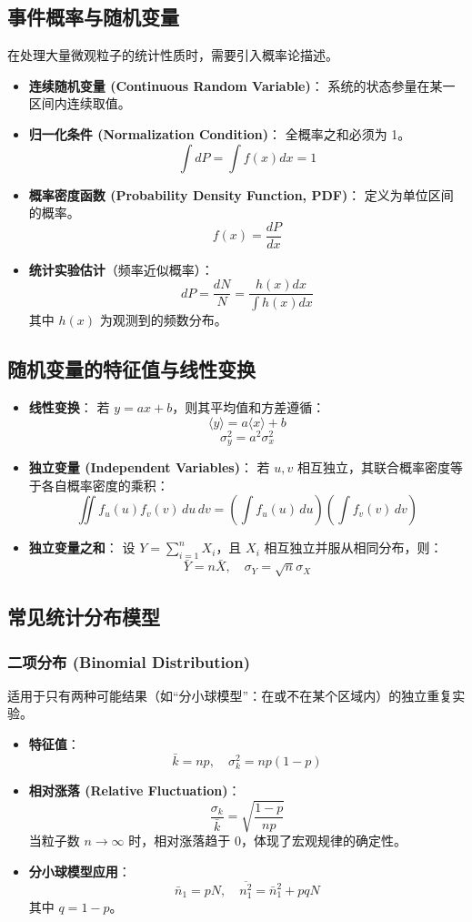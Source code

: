 \documentclass{article}
\begin{document}
\subsection{事件概率与随机变量}
在处理大量微观粒子的统计性质时，需要引入概率论描述。
\begin{itemize}
    \item \textbf{连续随机变量 (Continuous Random Variable)}：
    系统的状态参量在某一区间内连续取值。
    \item \textbf{归一化条件 (Normalization Condition)}：
    全概率之和必须为 1。
    \[ \int dP = \int f(x) dx = 1 \]
    \item \textbf{概率密度函数 (Probability Density Function, PDF)}：
    定义为单位区间的概率。
    \[ f(x) = \frac{dP}{dx} \]
    \item \textbf{统计实验估计}（频率近似概率）：
    \[ dP = \frac{dN}{N} = \frac{h(x) dx}{\int h(x) dx} \]
    其中 $h(x)$ 为观测到的频数分布。
\end{itemize}

\subsection{随机变量的特征值与线性变换}
\begin{itemize}
    \item \textbf{线性变换}：
    若 $y = ax + b$，则其平均值和方差遵循：
    \[ \langle y \rangle = a \langle x \rangle + b \]
    \[ \sigma_y^2 = a^2 \sigma_x^2 \]
    \item \textbf{独立变量 (Independent Variables)}：
    若 $u, v$ 相互独立，其联合概率密度等于各自概率密度的乘积：
    \[ \iint f_u(u) f_v(v) \, du \, dv = \left( \int f_u(u) \, du \right) \left( \int f_v(v) \, dv \right) \]
    \item \textbf{独立变量之和}：
    设 $Y = \sum_{i=1}^n X_i$，且 $X_i$ 相互独立并服从相同分布，则：
    \[ \bar{Y} = n \bar{X}, \quad \sigma_Y = \sqrt{n} \sigma_X \]
\end{itemize}

\subsection{常见统计分布模型}

\subsubsection{二项分布 (Binomial Distribution)}
适用于只有两种可能结果（如“分小球模型”：在或不在某个区域内）的独立重复实验。
\begin{itemize}
    \item \textbf{特征值}：
    \[ \bar{k} = np, \quad \sigma_k^2 = np(1-p) \]
    \item \textbf{相对涨落 (Relative Fluctuation)}：
    \[ \frac{\sigma_k}{\bar{k}} = \sqrt{\frac{1-p}{np}} \]
    当粒子数 $n \to \infty$ 时，相对涨落趋于 0，体现了宏观规律的确定性。
    \item \textbf{分小球模型应用}：
    \[ \bar{n}_1 = pN, \quad \overline{n_1^2} = \bar{n}_1^2 + pqN \]
    其中 $q = 1-p$。
\end{itemize}
\end{document}
